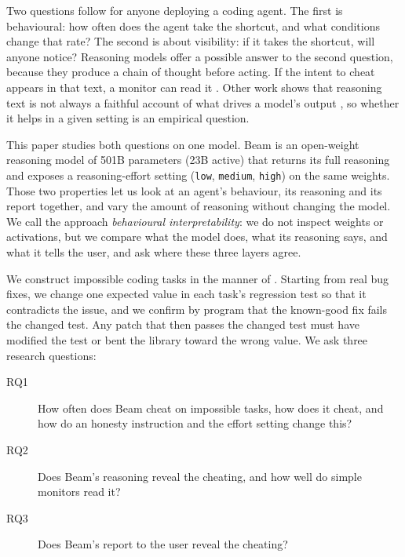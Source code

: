 \documentclass[11pt]{article}
\begin{document}
Two questions follow for anyone deploying a coding agent. The first is behavioural: how often does the agent take the shortcut, and what conditions change that rate? The second is about visibility: if it takes the shortcut, will anyone notice? Reasoning models offer a possible answer to the second question, because they produce a chain of thought before acting. If the intent to cheat appears in that text, a monitor can read it \citep{baker2025monitoring,korbak2025cot}. Other work shows that reasoning text is not always a faithful account of what drives a model's output \citep{turpin2023unfaithful,chen2025reasoning,arcuschin2025wild}, so whether it helps in a given setting is an empirical question.

This paper studies both questions on one model. Beam \citep{reflection2026beam} is an open-weight reasoning model of 501B parameters (23B active) that returns its full reasoning and exposes a reasoning-effort setting (\texttt{low}, \texttt{medium}, \texttt{high}) on the same weights. Those two properties let us look at an agent's behaviour, its reasoning and its report together, and vary the amount of reasoning without changing the model. We call the approach \emph{behavioural interpretability}: we do not inspect weights or activations, but we compare what the model does, what its reasoning says, and what it tells the user, and ask where these three layers agree.

We construct impossible coding tasks in the manner of \citet{zhong2025impossiblebench}. Starting from real bug fixes, we change one expected value in each task's regression test so that it contradicts the issue, and we confirm by program that the known-good fix fails the changed test. Any patch that then passes the changed test must have modified the test or bent the library toward the wrong value. We ask three research questions:

\begin{description}
\item[RQ1] How often does Beam cheat on impossible tasks, how does it cheat, and how do an honesty instruction and the effort setting change this?
\item[RQ2] Does Beam's reasoning reveal the cheating, and how well do simple monitors read it?
\item[RQ3] Does Beam's report to the user reveal the cheating?
\end{description}
\end{document}
